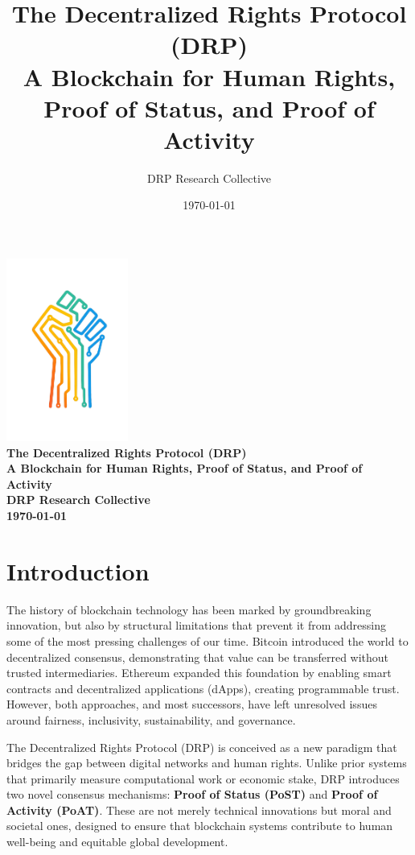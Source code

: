 \documentclass[11pt,a4paper]{article}
\title{\textbf{The Decentralized Rights Protocol (DRP)} \\ 
\large A Blockchain for Human Rights, Proof of Status, and Proof of Activity}
\author{DRP Research Collective}
\date{\today}
\begin{document}
\begin{titlepage}
\begin{center}
\vspace{3cm}
\includegraphics[width=0.3\textwidth]{DRP.png}\\[1cm]
\LARGE\bfseries
\textbf{The Decentralized Rights Protocol (DRP)} \\[0.5cm]
\large A Blockchain for Human Rights, Proof of Status, and Proof of Activity\\[2cm]
\large DRP Research Collective\\[1cm]
\today
\end{center}
\end{titlepage}

\newpage
\tableofcontents
\thispagestyle{empty}


\newpage

\section{Introduction}

The history of blockchain technology has been marked by groundbreaking innovation, but also by structural limitations that prevent it from addressing some of the most pressing challenges of our time. Bitcoin introduced the world to decentralized consensus, demonstrating that value can be transferred without trusted intermediaries. Ethereum expanded this foundation by enabling smart contracts and decentralized applications (dApps), creating programmable trust. However, both approaches, and most successors, have left unresolved issues around fairness, inclusivity, sustainability, and governance.

The Decentralized Rights Protocol (DRP) is conceived as a new paradigm that bridges the gap between digital networks and human rights. Unlike prior systems that primarily measure computational work or economic stake, DRP introduces two novel consensus mechanisms: \textbf{Proof of Status (PoST)} and \textbf{Proof of Activity (PoAT)}. These are not merely technical innovations but moral and societal ones, designed to ensure that blockchain systems contribute to human well-being and equitable global development.
\end{document}
